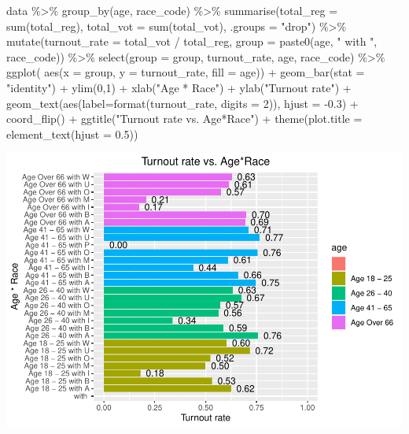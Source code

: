 \documentclass[
]{article}
\newenvironment{Shaded}{\begin{snugshade}}{\end{snugshade}}
\newcommand{\AttributeTok}[1]{\textcolor[rgb]{0.77,0.63,0.00}{#1}}
\newcommand{\DecValTok}[1]{\textcolor[rgb]{0.00,0.00,0.81}{#1}}
\newcommand{\FloatTok}[1]{\textcolor[rgb]{0.00,0.00,0.81}{#1}}
\newcommand{\FunctionTok}[1]{\textcolor[rgb]{0.00,0.00,0.00}{#1}}
\newcommand{\NormalTok}[1]{#1}
\newcommand{\SpecialCharTok}[1]{\textcolor[rgb]{0.00,0.00,0.00}{#1}}
\newcommand{\StringTok}[1]{\textcolor[rgb]{0.31,0.60,0.02}{#1}}
\begin{document}
\begin{Shaded}
\begin{Highlighting}[]
\NormalTok{data }\SpecialCharTok{\%\textgreater{}\%}
  \FunctionTok{group\_by}\NormalTok{(age, race\_code) }\SpecialCharTok{\%\textgreater{}\%}
  \FunctionTok{summarise}\NormalTok{(}\AttributeTok{total\_reg =} \FunctionTok{sum}\NormalTok{(total\_reg),}
            \AttributeTok{total\_vot =} \FunctionTok{sum}\NormalTok{(total\_vot), }\AttributeTok{.groups =} \StringTok{"drop"}\NormalTok{) }\SpecialCharTok{\%\textgreater{}\%}
  \FunctionTok{mutate}\NormalTok{(}\AttributeTok{turnout\_rate =}\NormalTok{ total\_vot }\SpecialCharTok{/}\NormalTok{ total\_reg,}
         \AttributeTok{group =} \FunctionTok{paste0}\NormalTok{(age, }\StringTok{" with "}\NormalTok{, race\_code)) }\SpecialCharTok{\%\textgreater{}\%}
  \FunctionTok{select}\NormalTok{(}\AttributeTok{group =}\NormalTok{ group, turnout\_rate, age, race\_code) }\SpecialCharTok{\%\textgreater{}\%}
  \FunctionTok{ggplot}\NormalTok{( }\FunctionTok{aes}\NormalTok{(}\AttributeTok{x =}\NormalTok{ group, }\AttributeTok{y =}\NormalTok{ turnout\_rate, }\AttributeTok{fill =}\NormalTok{ age)) }\SpecialCharTok{+}
  \FunctionTok{geom\_bar}\NormalTok{(}\AttributeTok{stat =} \StringTok{"identity"}\NormalTok{) }\SpecialCharTok{+}
  \FunctionTok{ylim}\NormalTok{(}\DecValTok{0}\NormalTok{,}\DecValTok{1}\NormalTok{) }\SpecialCharTok{+}
  \FunctionTok{xlab}\NormalTok{(}\StringTok{"Age * Race"}\NormalTok{) }\SpecialCharTok{+} \FunctionTok{ylab}\NormalTok{(}\StringTok{"Turnout rate"}\NormalTok{) }\SpecialCharTok{+}
  \FunctionTok{geom\_text}\NormalTok{(}\FunctionTok{aes}\NormalTok{(}\AttributeTok{label=}\FunctionTok{format}\NormalTok{(turnout\_rate, }\AttributeTok{digits =} \DecValTok{2}\NormalTok{)), }\AttributeTok{hjust =} \SpecialCharTok{{-}}\FloatTok{0.3}\NormalTok{) }\SpecialCharTok{+}
  \FunctionTok{coord\_flip}\NormalTok{() }\SpecialCharTok{+}
  \FunctionTok{ggtitle}\NormalTok{(}\StringTok{"Turnout rate vs. Age*Race"}\NormalTok{) }\SpecialCharTok{+}
    \FunctionTok{theme}\NormalTok{(}\AttributeTok{plot.title =} \FunctionTok{element\_text}\NormalTok{(}\AttributeTok{hjust =} \FloatTok{0.5}\NormalTok{))}
\end{Highlighting}
\end{Shaded}

\includegraphics{CS2_files/figure-latex/unnamed-chunk-16-1.pdf}
\end{document}
